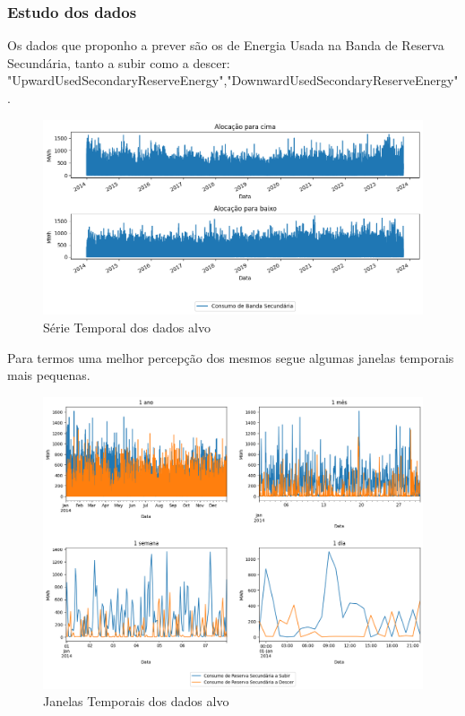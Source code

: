 
\subsubsection{Estudo dos dados}

Os dados que proponho a prever são os de Energia Usada na Banda de Reserva Secundária, tanto a subir como a descer: "UpwardUsedSecondaryReserveEnergy","DownwardUsedSecondaryReserveEnergy".\par



\begin{figure}[H]
  \centering
  \includegraphics[width=\textwidth]{plots/consumo_originais.png}
  \caption{Série Temporal dos dados alvo}
  \label{fig:targettimeseries}
\end{figure}


Para termos uma melhor percepção dos mesmos segue algumas janelas temporais mais pequenas.

\begin{figure}[H]
  \centering
  \includegraphics[width=\textwidth]{plots/target_timeseries_windows.png}
  \caption{Janelas Temporais dos dados alvo}
  \label{fig:targettimeserieswindows}
\end{figure}


